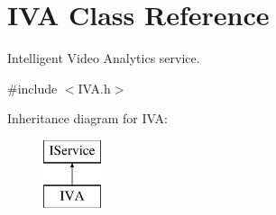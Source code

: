 \hypertarget{class_i_v_a}{}\section{I\+VA Class Reference}
\label{class_i_v_a}


Intelligent Video Analytics service.  




{\ttfamily \#include $<$I\+V\+A.\+h$>$}

Inheritance diagram for I\+VA\+:\begin{figure}[H]
\begin{center}
\leavevmode
\includegraphics[height=2.000000cm]{class_i_v_a}
\end{center}
\end{figure}
